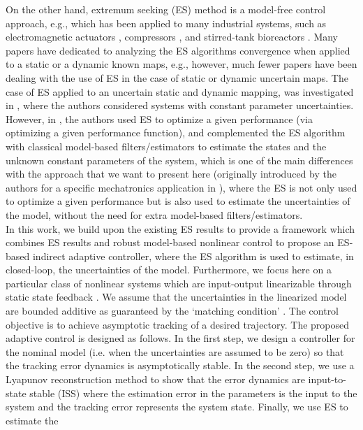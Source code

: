 \documentclass[twoside,leqno,onecolumn]{article}
\begin{document}
On the other hand, extremum seeking (ES) method is a model-free
control approach, e.g.\cite{Ariy03}, which has been applied to
many industrial systems, such as electromagnetic actuators \cite{
Beno13,Atinc13}, compressors \cite{WYK00}, and stirred-tank
bioreactors \cite{Zhang03}. Many papers have dedicated to
analyzing the ES algorithms convergence when applied to a static
or a dynamic known maps, e.g.\cite{Rote00,Ariy03,KW00,Teel01},
however, much fewer papers have been dealing with the use of ES in
the case of static or dynamic uncertain maps. The case of ES
applied to an uncertain static and dynamic mapping, was
investigated in \cite{Nesic13}, where the authors considered
systems with constant parameter uncertainties. However, in
\cite{Nesic13}, the authors used ES to optimize a given
performance (via optimizing a given performance function), and
complemented the ES algorithm with classical model-based
filters/estimators to estimate the states and the unknown constant
parameters of the system, which is one of the main differences
with the approach that we want to present here (originally
introduced by the authors for a specific mechatronics application
in \cite{Atinc13,BA13,patent_1}), where the ES is not only used to
optimize a given performance but is also used to estimate the
uncertainties of the model, without the need for extra model-based
filters/estimators. \\In this work, we build upon the existing ES
results to provide a framework which combines ES results and
robust model-based nonlinear control to propose an ES-based
indirect adaptive controller, where the ES algorithm is used to
estimate, in closed-loop, the uncertainties of the model.
Furthermore, we focus here on a particular class of nonlinear
systems which are input-output linearizable through static state
feedback \cite{Khalil02}. We assume that the uncertainties in the
linearized model are bounded additive as guaranteed by the
`matching condition' \cite{Beno09}. The control objective is to
achieve asymptotic tracking of a desired trajectory. The proposed
adaptive control is designed as follows. In the first step, we
design a controller for the nominal model (i.e. when the
uncertainties are assumed to be zero) so that the tracking error
dynamics is asymptotically stable. In the second step, we use a
Lyapunov reconstruction method \cite{Beno10} to show that the
error dynamics are input-to-state stable (ISS)
\cite{Khalil02,Sontag95} where the estimation error in the
parameters is the input to the system and the tracking error
represents the system state. Finally, we use ES to estimate the
\end{document}
